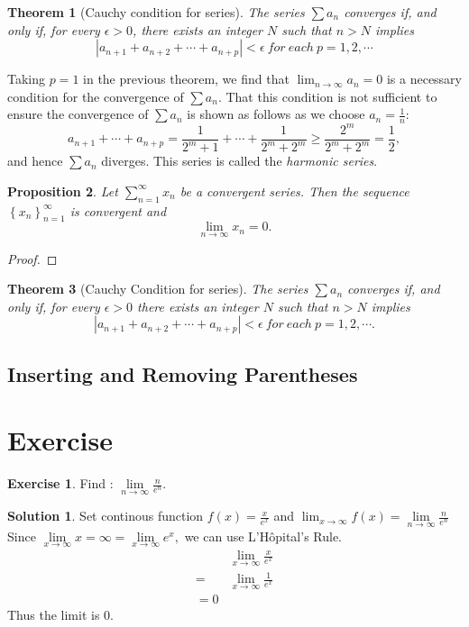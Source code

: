 \documentclass{article}
\newtheorem{theorem}{Theorem}[section]
\newtheorem{prop}[theorem]{Proposition}
\theoremstyle{definition}
\newtheorem{exe}{Exercise}[section]
\newtheorem{sol}{Solution}[exe]
\begin{document}
\begin{theorem}[Cauchy condition for series]
    The series $\sum a_{n}$ converges if, and only if,
    for every $\epsilon>0$, there exists an integer $N$ such that
    $n>N$ implies 
    $$|a_{n+1}+a_{n+2}+\cdots+a_{n+p}|<\epsilon\ for\ each\ p=1,2,\cdots$$
\end{theorem}

Taking $p=1$ in the previous theorem, we find that $\lim_{n\rightarrow \infty}a_{n}=0$ is 
a necessary condition for the convergence of $\sum a_{n}$. That this condition is not sufficient
to ensure the convergence of $\sum a_{n}$ is shown as follows as we choose $a_{n}=\frac{1}{n}$:
$$a_{n+1}+\cdots+a_{n+p}=\frac{1}{2^{m}+1}+\cdots+\frac{1}{2^{m}+2^{m}}\geq\frac{2^{m}}{2^{m}+2^{m}}=\frac{1}{2},$$
and hence $\sum a_{n}$ diverges. This series is called the \textit{harmonic series}.

\begin{prop}
    Let $\sum_{n=1}^{\infty}x_{n}$ be a convergent series. Then the sequence 
    $\left\{x_{n}\right\}_{n=1}^{\infty}$ is convergent and $$\lim_{n\rightarrow \infty}x_{n} = 0.$$
\end{prop}

\begin{proof}
    
\end{proof}



\begin{theorem}[Cauchy Condition for series]
    The series $\sum a_{n}$ converges if, and only if, for every $\epsilon>0$ there exists an integer $N$ such that $n>N$ implies
    $$|a_{n+1}+a_{n+2}+\cdots+a_{n+p}|<\epsilon\ for\ each\ p=1,2,\cdots.$$
\end{theorem}


\subsection{Inserting and Removing Parentheses}

\newpage
\section{Exercise}


\begin{exe}
Find : $\underset{n \to \infty}{\lim}\frac{n}{e^{n}}.$ 
\end{exe}
\begin{sol}
    Set continous function $f(x)=\frac{x}{e^{x}}$ and $\lim_{x\to \infty}f(x)=\underset{n \to \infty}{\lim}\frac{n}{e^{n}}$
Since $\underset{x \to \infty}{\lim}x=\infty=\underset{x \to \infty}{\lim}e^{x},$ we can use L'Hôpital's Rule.
\begin{align*}
    &\underset{x \to \infty}{\lim}\frac{x}{e^{x}}\\
    =& \underset{x \to \infty}{\lim}\frac{1}{e^{x}}\\
    =0
\end{align*}
Thus the limit is $0$.
\end{sol}
\end{document}
